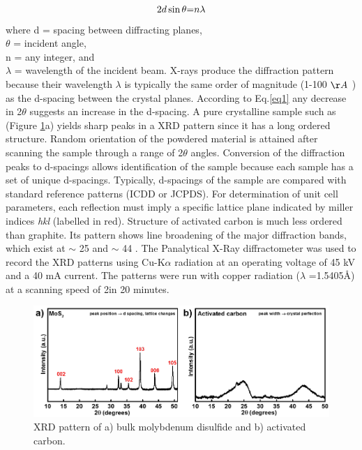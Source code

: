  \begin{equation} \label{eq1}
     2d\sin\theta \text= n{\lambda}
 \end{equation}
 where d = spacing between diffracting planes,\\
$\theta$ = incident angle,\\ 
n = any integer, and \\
$\lambda$ = wavelength of the incident beam. X-rays produce the diffraction pattern because their wavelength $\lambda$ is typically the same order of magnitude (1-100 $\AA$ ) as the d-spacing between the crystal planes. According to Eq.\ref{eq1} any decrease in 2$\theta$ suggests an increase in the d-spacing. 
A pure crystalline sample such as  (Figure \ref{Figures/chap2fig:XRD}a) yields sharp peaks in a XRD pattern since it has a long ordered structure. Random orientation of the powdered material is attained after scanning the sample through a range of 2$\theta$ angles. Conversion of the diffraction peaks to d-spacings allows identification of the sample because each sample has a set of unique d-spacings. Typically, d-spacings of the sample are compared with standard reference patterns (ICDD or JCPDS). For determination of unit cell parameters, each reflection must imply a specific lattice plane indicated by miller indices \textit{hkl} (labelled in red). Structure of activated carbon is much less ordered than graphite. Its pattern shows line broadening of the major diffraction bands, which exist at $\sim$ 25 \textdegree and $\sim$ 44 \textdegree .
The Panalytical X-Ray diffractometer was used to record the XRD patterns using Cu-K$\alpha$ radiation at an operating voltage of 45 kV and a 40 mA current. The patterns were run with copper radiation ($\lambda$ =1.5405\AA) at a scanning speed of 2\textdegree in 20 minutes. 

\begin{figure}[tbh!]
\centering
\includegraphics[width=\textwidth]{Figures/chap2fig/XRD}
\caption{XRD pattern of a) bulk molybdenum disulfide and b) activated carbon.}
\label{Figures/chap2fig:XRD}
\end{figure}

